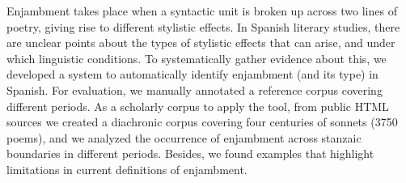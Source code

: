 Enjambment takes place when a syntactic unit is broken up across two lines of poetry, giving rise to different stylistic effects. In Spanish literary studies, there are unclear points about the types of stylistic effects that can arise, and under which linguistic conditions. To systematically gather evidence about this, we developed a system to automatically identify enjambment (and its type) in Spanish. For evaluation, we manually annotated a reference corpus covering different periods. As a scholarly corpus to apply the tool, from public HTML sources we created a diachronic corpus covering four centuries of sonnets (3750 poems), and we analyzed the occurrence of enjambment across stanzaic boundaries in different periods. Besides, we found examples that highlight limitations in current definitions of enjambment.
